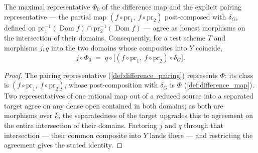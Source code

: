 \begin{lemma}
  \label{lem:diff_representative_agreement}
  \leanok
  The maximal representative \(\Phi_0\) of the difference map and the explicit
  pairing representative --- the partial map \((f \circ \mathrm{pr}_1,\ f \circ
  \mathrm{pr}_2)\) post-composed with \(\delta_G\), defined on
  \(\mathrm{pr}_1^{-1}(\operatorname{Dom} f) \cap
  \mathrm{pr}_2^{-1}(\operatorname{Dom} f)\) --- agree as honest morphisms on the
  intersection of their domains. Consequently, for a test scheme \(T\) and
  morphisms \(j, q\) into the two domains whose composites into \(Y\) coincide,
  \[
    j \circ \Phi_0 \;=\; q \circ \bigl[(f \circ \mathrm{pr}_1,\ f \circ
      \mathrm{pr}_2) \circ \delta_G\bigr].
  \]
\end{lemma}
\begin{proof}
  \leanok
  The pairing representative (\ref{def:difference_pairing}) represents \(\Phi\):
  its class is \((f \circ \mathrm{pr}_1,\ f \circ \mathrm{pr}_2)\), whose
  post-composition with \(\delta_G\) is \(\Phi\) (\ref{def:difference_map}). Two
  representatives of one rational map out of a reduced source into a separated
  target agree on any dense open contained in both domains; as both are morphisms
  over \(\bar k\), the separatedness of the target upgrades this to agreement on
  the entire intersection of their domains. Factoring \(j\) and \(q\) through that
  intersection --- their common composite into \(Y\) lands there --- and
  restricting the agreement gives the stated identity.
\end{proof}

